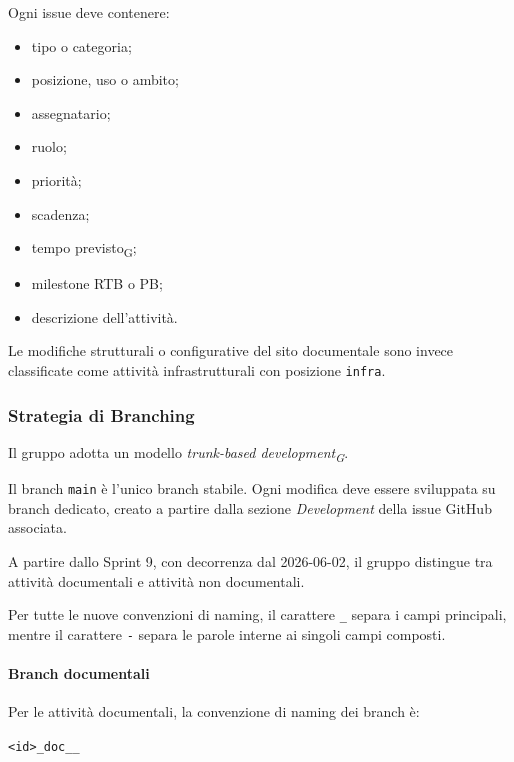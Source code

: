 Ogni issue deve contenere:

\begin{itemize}
    \item tipo o categoria;
    \item posizione, uso o ambito;
    \item assegnatario;
    \item ruolo;
    \item priorità;
    \item scadenza;
    \item tempo previsto\textsubscript{G};
    \item milestone RTB o PB;
    \item descrizione dell'attività.
\end{itemize}

Le modifiche strutturali o configurative del sito documentale sono invece
classificate come attività infrastrutturali con posizione \texttt{infra}.


\subsubsection{Strategia di Branching}

Il gruppo adotta un modello \textit{trunk-based development\textsubscript{G}}.

Il branch \texttt{main} è l'unico branch stabile. Ogni modifica deve essere sviluppata su branch dedicato, creato a partire dalla
sezione \textit{Development} della issue GitHub associata.

A partire dallo Sprint 9, con decorrenza dal 2026-06-02, il gruppo distingue tra
attività documentali e attività non documentali.

Per tutte le nuove convenzioni di naming, il carattere \texttt{\_} separa i campi
principali, mentre il carattere \texttt{-} separa le parole interne ai singoli
campi composti.

\paragraph{Branch documentali}

Per le attività documentali, la convenzione di naming dei branch è:

\begin{center}
    \texttt{<id>\_doc\_<categoria-uso>\_<nome-documento>}
\end{center}

